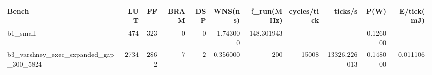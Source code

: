 \begin{tabular}{lrrrrrrrrrr}
\hline
Bench & LUT & FF & BRAM & DSP & WNS(ns) & f\_run(MHz) & cycles/tick & ticks/s & P(W) & E/tick(mJ) \\
\hline
b1\_small & 474 & 323 & 0 & 0 & -1.743000 & 148.301943 & - & - & 0.126000 & - \\
b3\_varshney\_exec\_expanded\_gap\_300\_5824 & 2734 & 2862 & 7 & 2 & 0.356000 & 200 & 15008 & 13326.226013 & 0.148000 & 0.011106 \\
\hline
\end{tabular}
